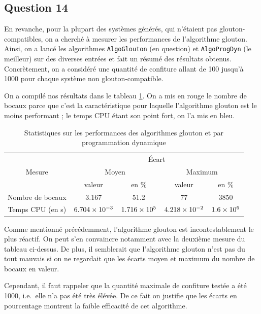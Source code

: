 \documentclass[12pt,a4paper]{article}
\begin{document}
 \subsection*{Question 14}
 En revanche, pour la plupart des syst\`emes g\'en\'er\'es, qui n'\'etaient pas glouton-compatibles, on a cherch\'e \`a mesurer les performances de l'algorithme glouton. Ainsi, on a lanc\'e les algorithmes \texttt{AlgoGlouton} (en question) et \texttt{AlgoProgDyn} (le meilleur) sur des diverses entr\'ees et fait un r\'esum\'e des r\'esultats obtenus. Concr\`etement, on a consid\'er\'e une quantit\'e de confiture allant de 100 jusqu'\`a 1000 pour chaque syst\`eme non glouton-compatible.
 
 On a compil\'e nos r\'esultats dans le tableau \ref{tab:stats}. On a mis en rouge le nombre de bocaux parce que c'est la caract\'eristique pour laquelle l'algorithme glouton est le moins performant ; le temps CPU \'etant son point fort, on l'a mis en bleu.
 
 \begin{table}
    \begin{tabular}{|c|cc|cc|}
	\hline \multirow{3}{*}{Mesure} & \multicolumn{4}{c|}{\'Ecart} \\ 
    \cline{2-5} & \multicolumn{2}{c}{Moyen} & \multicolumn{2}{c|}{Maximum} \\ 
	\cline{2-5} &  valeur & en \% & valeur & en \% \\ 
    \hline \color{red} Nombre de bocaux & 3.167 & 51.2 & 77 & 3850 \\ 
	\hline \color{blue} Temps CPU (en \si{s}) & $\num{6.704E-03}$ & $\num{1.716E+05}$ & $\num{4.218E-02}$ & $\num{1.6E+06}$ \\ 
	\hline
	\end{tabular}
	\caption[Performance compar\'ee de l'algorithme glouton]{Statistiques sur les performances des algorithmes glouton et par programmation dynamique}
  \label{tab:stats}
\end{table}

Comme mentionn\'e pr\'ec\'edemment, l'algorithme glouton est incontestablement le plus r\'eactif. On peut s'en convaincre notamment avec la deuxi\`eme mesure du tableau ci-dessus. De plus, il semblerait que l'algorithme glouton n'est pas du tout mauvais si on ne regardait que les \'ecarts moyen et maximum du nombre de bocaux en valeur. 

Cependant, il faut rappeler que la quantit\'e maximale de confiture test\'ee a \'et\'e 1000, i.e.\ elle n'a pas \'et\'e tr\`es \'el\'ev\'ee. De ce fait on justifie que les \'ecarts en pourcentage montrent la faible efficacit\'e de cet algorithme.
\end{document}
